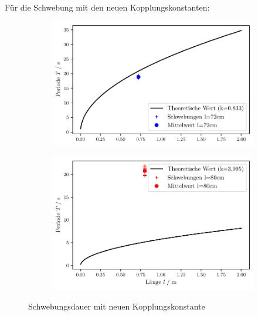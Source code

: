 Für die Schwebung mit den neuen Kopplungskonstanten:
\begin{figure}
    \begin{subfigure}[c]{0.5\textwidth}
        \includegraphics[width=\textwidth]{plots/plot8.pdf}
    \end{subfigure}
    \begin{subfigure}[c]{0.5\textwidth}
        \includegraphics[width=\textwidth]{plots/plot9.pdf}
    \end{subfigure}
    \caption{Schwebungsdauer mit neuen Kopplungskonstante}
\end{figure}